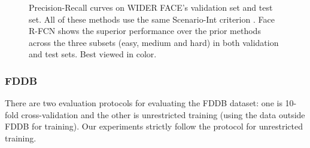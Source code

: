 \documentclass{article} %
\begin{document}
\begin{figure}
{  }
  \caption{Precision-Recall curves on WIDER FACE's validation set and test set. All of these methods use the same Scenario-Int criterion \cite{wider}. Face R-FCN shows the superior performance over the prior methods across the three subsets (easy, medium and hard) in both validation and test sets. Best viewed in color.
}\label{3}

\end{figure}

\subsubsection{FDDB}


There are two evaluation protocols for evaluating the FDDB dataset: one is 10-fold cross-validation and the other is unrestricted training (using the data outside FDDB for training). Our experiments strictly follow the protocol for unrestricted training.
\end{document}
